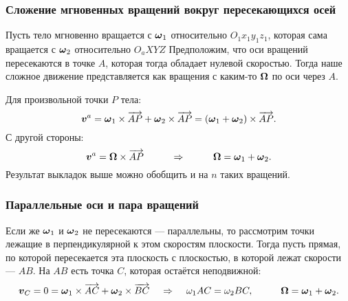 \subsubsection*{Сложение мгновенных вращений вокруг пересекающихся осей}
Пусть тело мгновенно вращается с $\mbox{\boldmath $\omega$}_1 $ относительно $O_1 x_1 y_1 z_1$, которая сама вращается с $\mbox{\boldmath $\omega$}_2$ относительно $O_a X Y Z$
Предположим, что оси вращений пересекаются в точке $A$, которая тогда обладает нулевой скоростью. Тогда наше сложное движение представляется как вращения с каким-то $\mbox{\boldmath $\Omega$}$ по оси через $A$. 

Для произвольной точки $P$ тела:
\begin{equation*}
	\mbox{\boldmath $v$}^a = \mbox{\boldmath $\omega$}_1 \times \overrightarrow{A P} + \mbox{\boldmath $\omega$}_2 \times \overrightarrow{A P} = (\mbox{\boldmath $\omega$}_1 + \mbox{\boldmath $\omega$}_2) \times \overrightarrow{A P}.
\end{equation*}
С другой стороны:
\begin{equation*}
	\mbox{\boldmath $v$}^a = \mbox{\boldmath $\Omega$} \times \overrightarrow{A P}
	\hspace*{1 cm}
	\Rightarrow
	\hspace*{1 cm}
	\mbox{\boldmath $\Omega$} = \mbox{\boldmath $\omega$}_1 + \mbox{\boldmath $\omega$}_2.
\end{equation*}
Результат выкладок выше можно обобщить и на $n$ таких вращений.

\subsubsection*{Параллельные оси и пара вращений}
Если же $\mbox{\boldmath $\omega$}_1$ и $\mbox{\boldmath $\omega$}_2$ не пересекаются --- параллельны, то рассмотрим точки лежащие в перпендикулярной к этом скоростям плоскости.
Тогда пусть прямая, по которой пересекается эта плоскость с плоскостью, в которой лежат скорости --- $A B$. На $A B$ есть точка $C$, которая остаётся неподвижной:
\begin{equation*}
	\mbox{\boldmath $v$}_C = 0 = \mbox{\boldmath $\omega$}_1 \times \overrightarrow{A C} + \mbox{\boldmath $\omega$}_2 \times \overrightarrow{B C}
	\hspace*{0.4 cm}
	\Rightarrow
	\hspace*{0.4 cm}
	\omega_1 AC = \omega_2 BC,
	\hspace*{1 cm}
	\mbox{\boldmath $\Omega$} = \mbox{\boldmath $\omega$}_1 + \mbox{\boldmath $\omega$}_2.
\end{equation*}
 
